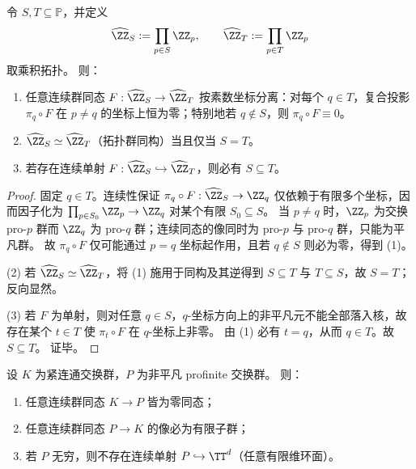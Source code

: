 \begin{theorem}[素数完备化轴的不可混叠与同构刚性]\label{thm:conclusion-prime-adic-axis-no-aliasing-rigidity}
令 \(S,T\subseteq\mathbb P\)，并定义
\[
\widehat{\ZZ}_S:=\prod_{p\in S}\ZZ_p,
\qquad
\widehat{\ZZ}_T:=\prod_{p\in T}\ZZ_p
\]
取乘积拓扑。
则：
\begin{enumerate}
  \item 任意连续群同态 \(F:\widehat{\ZZ}_S\to\widehat{\ZZ}_T\) 按素数坐标分离：对每个 \(q\in T\)，复合投影 \(\pi_q\circ F\) 在 \(p\neq q\) 的坐标上恒为零；特别地若 \(q\notin S\)，则 \(\pi_q\circ F\equiv 0\)。
  \item \(\widehat{\ZZ}_S\simeq \widehat{\ZZ}_T\)（拓扑群同构）当且仅当 \(S=T\)。
  \item 若存在连续单射 \(F:\widehat{\ZZ}_S\hookrightarrow \widehat{\ZZ}_T\)，则必有 \(S\subseteq T\)。
\end{enumerate}
\end{theorem}

\begin{proof}
固定 \(q\in T\)。连续性保证 \(\pi_q\circ F:\widehat{\ZZ}_S\to \ZZ_q\) 仅依赖于有限多个坐标，因而因子化为
\(
\prod_{p\in S_0}\ZZ_p\to \ZZ_q
\)
对某个有限 \(S_0\subseteq S\)。
当 \(p\neq q\) 时，\(\ZZ_p\) 为交换 pro-\(p\) 群而 \(\ZZ_q\) 为 pro-\(q\) 群；连续同态的像同时为 pro-\(p\) 与 pro-\(q\) 群，只能为平凡群。
故 \(\pi_q\circ F\) 仅可能通过 \(p=q\) 坐标起作用，且若 \(q\notin S\) 则必为零，得到 (1)。

(2) 若 \(\widehat{\ZZ}_S\simeq\widehat{\ZZ}_T\)，将 (1) 施用于同构及其逆得到 \(S\subseteq T\) 与 \(T\subseteq S\)，故 \(S=T\)；反向显然。

(3) 若 \(F\) 为单射，则对任意 \(q\in S\)，\(q\)-坐标方向上的非平凡元不能全部落入核，故存在某个 \(t\in T\) 使 \(\pi_t\circ F\) 在 \(q\)-坐标上非零。
由 (1) 必有 \(t=q\)，从而 \(q\in T\)。故 \(S\subseteq T\)。
证毕。
\end{proof}

\begin{proposition}\label{prop:conclusion-connected-profinite-orthogonality}
设 \(K\) 为紧连通交换群，\(P\) 为非平凡 profinite 交换群。
则：
\begin{enumerate}
  \item 任意连续群同态 \(K\to P\) 皆为零同态；
  \item 任意连续群同态 \(P\to K\) 的像必为有限子群；
  \item 若 \(P\) 无穷，则不存在连续单射 \(P\hookrightarrow \TT^d\)（任意有限维环面）。
\end{enumerate}
\end{proposition}

